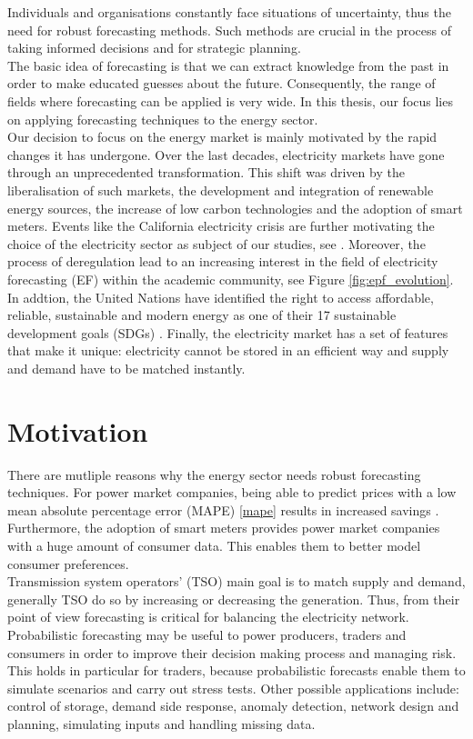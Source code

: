 Individuals and organisations constantly face situations of uncertainty, thus the need for robust forecasting methods. Such methods are crucial in the process of taking informed decisions and for strategic planning.
\\
The basic idea of forecasting is that we can extract knowledge from the past in order to make educated guesses about the future. Consequently, the range of fields where forecasting can be applied is very wide.
In this thesis, our focus lies on applying forecasting techniques to the energy sector. 
\\
Our decision to focus on the energy market is mainly motivated by the rapid changes it has undergone. %
Over the last decades, electricity markets have gone through an unprecedented transformation. This shift was driven by the liberalisation of such markets, the development and integration of renewable energy sources, the  increase of low carbon technologies and the adoption of smart meters. Events like the California electricity crisis are further motivating the choice of the electricity sector as subject of our studies, see \cite{california}.
Moreover, the process of deregulation lead to an increasing interest in the field of electricity forecasting (EF) within the academic community, see Figure \ref{fig:epf_evolution}.
In addtion, the United Nations have identified the right to access affordable, reliable, sustainable and modern energy as one of their 17 sustainable development goals (SDGs) .
Finally, the electricity market has a set of features that make it unique: electricity cannot be stored in an efficient way and supply and demand have to be matched instantly.
\\
\section{Motivation}
There are mutliple reasons why the energy sector needs robust forecasting techniques.
For power market companies, being able to predict prices with a low mean absolute percentage error (MAPE) \ref{mape} results in increased savings \cite{savings}. Furthermore, the adoption of smart meters provides power market companies with a huge amount of consumer data. This enables them to better model consumer preferences.
\\
Transmission system operators' (TSO) main goal is to match supply and demand, generally TSO do so by increasing or decreasing the generation. Thus, from their point of view forecasting is critical for balancing the electricity network.
Probabilistic forecasting may be useful to power producers, traders and consumers in order to improve their decision making process and managing risk. This holds in particular for traders, because probabilistic forecasts enable them to simulate scenarios and carry out stress tests.
Other possible applications include: control of storage, demand side response, anomaly detection, network design and planning, simulating inputs and handling missing data.
\\
